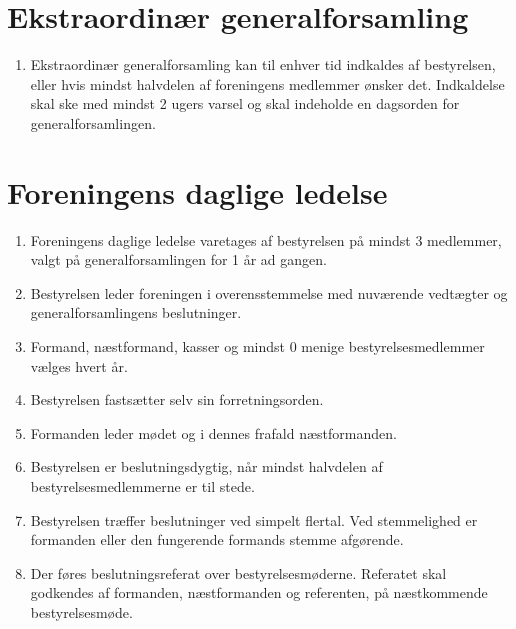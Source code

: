 \documentclass[a4paper, 10pt]{article}
\renewcommand\thesection{\textsection\arabic{section}}
\newenvironment{stykenum}{
  \begin{enumerate}[%
    label=Stk.~\arabic*:, ref=\thesection~Stk.~\arabic{enumi}, start=1]
}{\end{enumerate}}
\begin{document}
\section{Ekstraordinær generalforsamling}
\begin{stykenum}
    \item Ekstraordinær generalforsamling kan til enhver tid indkaldes af
        bestyrelsen, eller hvis mindst halvdelen af foreningens medlemmer ønsker
        det. Indkaldelse skal ske med mindst 2 ugers varsel og skal indeholde en
        dagsorden for generalforsamlingen.
\end{stykenum}

\section{Foreningens daglige ledelse}
\begin{stykenum}
    \item Foreningens daglige ledelse varetages af bestyrelsen på mindst 3
        medlemmer, valgt på generalforsamlingen for 1 år ad gangen.

    \item Bestyrelsen leder foreningen i overensstemmelse med nuværende
        vedtægter og generalforsamlingens beslutninger.

    \item Formand, næstformand, kasser og mindst 0 menige bestyrelsesmedlemmer
        vælges hvert år.

    \item Bestyrelsen fastsætter selv sin forretningsorden.

    \item Formanden leder mødet og i dennes frafald næstformanden.

    \item Bestyrelsen er beslutningsdygtig, når mindst halvdelen af
        bestyrelsesmedlemmerne er til stede.

    \item Bestyrelsen træffer beslutninger ved simpelt flertal. Ved stemmelighed
        er formanden eller den fungerende formands stemme afgørende.

    \item Der føres beslutningsreferat over bestyrelsesmøderne. Referatet skal 
        godkendes af formanden, næstformanden og referenten, på næstkommende bestyrelsesmøde.
\end{stykenum}
\end{document}
